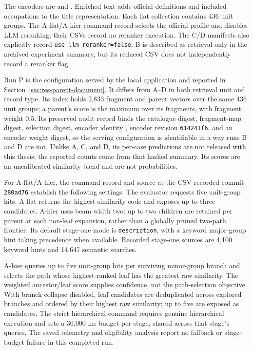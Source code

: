 The encoders are  and
. Enriched text adds official
definitions and included occupations to the title representation.
Each flat collection contains 436 unit groups. The A-flat/A-hier command
record selects the official profile and disables LLM reranking; their CSVs
record no reranker execution. The C/D manifests also explicitly record
\texttt{use\_llm\_reranker=false}. B is described as retrieval-only in the
archived experiment summary, but its reduced CSV does not independently
record a reranker flag.

Run P is the configuration served by the local application and reported in
Section~\ref{sec:res-parent-document}. It differs from A--D in both
retrieval unit and record type. Its index holds 2,833 fragment and parent
vectors over the same 436 unit groups; a parent's score is the maximum
over its fragments, with fragment weight $0.5$. Its preserved audit record
binds the catalogue digest, fragment-map digest, selection digest, encoder
identity , encoder revision
\texttt{614241f6}, and an encoder weight digest, so the serving
configuration is identifiable in a way runs B and D are not. Unlike A, C,
and D, its per-case predictions are not released with this thesis; the
reported counts come from that hashed summary. Its scores are an
uncalibrated similarity blend and are not probabilities.

For A-flat/A-hier, the command record and source at the CSV-recorded
commit \texttt{280ad76} establish the following settings. The evaluator
requests five unit-group hits. A-flat returns the highest-similarity code
and exposes up to three candidates. A-hier uses beam width two:
up to two children are retained per parent at each non-leaf expansion,
rather than a globally pruned two-path frontier. Its default stage-one
mode is \texttt{description}, with a keyword major-group hint taking
precedence when available. Recorded stage-one sources are 4,100 keyword
hints and 14,647 semantic searches.

A-hier queries up to five unit-group hits per surviving minor-group
branch and selects the path whose highest-ranked leaf has the greatest
raw similarity. The weighted ancestor/leaf score supplies confidence,
not the path-selection objective. With branch collapse disabled, leaf
candidates are deduplicated across explored branches and ordered by
their highest raw similarity; up to five are exposed as candidates.
The strict hierarchical command requires genuine hierarchical execution
and sets a 30,000 ms budget per stage, shared across that stage's queries.
The saved telemetry and eligibility analysis report no fallback or
stage-budget failure in this completed run.

